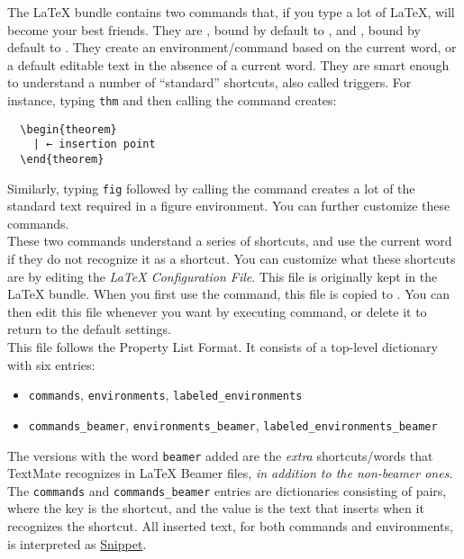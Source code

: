 \documentclass[11pt, x11names]{article}
\begin{document}
The LaTeX bundle contains two commands that, if you type a lot of LaTeX, will become your best friends. They are , bound by default to \keys{\cmd + \textless{}}, and , bound by default to \keys{\cmd + \textgreater{}}. They create an environment/command based on the current word, or a default editable text in the absence of a current word. They are smart enough to understand a number of “standard” shortcuts, also called triggers. For instance, typing \texttt{thm} and then calling the  command creates:

\begin{verbatim}
  \begin{theorem}
    | ← insertion point
  \end{theorem}
\end{verbatim}

Similarly, typing \texttt{fig} followed by calling the  command creates a lot of the standard text required in a figure environment. You can further customize these commands.\\

These two commands understand a series of shortcuts, and use the current word if they do not recognize it as a shortcut. You can customize what these shortcuts are by editing the \emph{LaTeX Configuration File}. This file is originally kept in the LaTeX bundle. When you first use the  command, this file is copied to . You can then edit this file whenever you want by executing  command, or delete it to return to the default settings.\\

This file follows the Property List Format. It consists of a top-level dictionary
with six entries:

\begin{itemize}
  \item \texttt{commands}, \texttt{environments}, \texttt{labeled\_environments}
  \item \texttt{commands\_beamer}, \texttt{environments\_beamer}, \texttt{labeled\_environments\_beamer}
\end{itemize}

\begin{sloppypar}
The versions with the word \texttt{beamer} added are the \emph{extra} shortcuts/words that TextMate recognizes in LaTeX Beamer files, \emph{in addition to the non-beamer ones}. The \texttt{commands} and \texttt{commands\_beamer} entries are dictionaries consisting of pairs, where the key is the shortcut, and the value is the text that  inserts when it recognizes the shortcut. All inserted text, for both commands and environments, is interpreted as \href{http://manual.textmate.org/snippets.html#snippets}{Snippet}.\\
\end{sloppypar}
\end{document}
